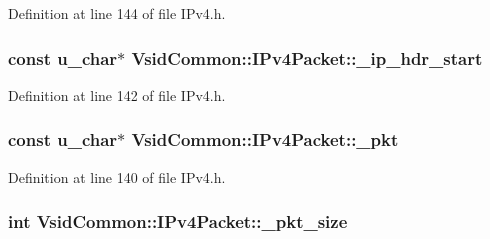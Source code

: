 Definition at line 144 of file I\-Pv4.\-h.

\hypertarget{class_vsid_common_1_1_i_pv4_packet_ab9d1ecb868ec5cd9f14e62b90edc05c8}{
\subsubsection[{\-\_\-ip\-\_\-hdr\-\_\-start}]{\setlength{\rightskip}{0pt plus 5cm}const u\-\_\-char$\ast$ Vsid\-Common\-::\-I\-Pv4\-Packet\-::\-\_\-ip\-\_\-hdr\-\_\-start\hspace{0.3cm}{\ttfamily [protected]}}}\label{class_vsid_common_1_1_i_pv4_packet_ab9d1ecb868ec5cd9f14e62b90edc05c8}


Definition at line 142 of file I\-Pv4.\-h.

\hypertarget{class_vsid_common_1_1_i_pv4_packet_ae39b78b3e02fe344d6a0aaa10bad55b6}{
\subsubsection[{\-\_\-pkt}]{\setlength{\rightskip}{0pt plus 5cm}const u\-\_\-char$\ast$ Vsid\-Common\-::\-I\-Pv4\-Packet\-::\-\_\-pkt\hspace{0.3cm}{\ttfamily [protected]}}}\label{class_vsid_common_1_1_i_pv4_packet_ae39b78b3e02fe344d6a0aaa10bad55b6}


Definition at line 140 of file I\-Pv4.\-h.

\hypertarget{class_vsid_common_1_1_i_pv4_packet_a2d4133be37c304ebf4951f975647a2f2}{
\subsubsection[{\-\_\-pkt\-\_\-size}]{\setlength{\rightskip}{0pt plus 5cm}int Vsid\-Common\-::\-I\-Pv4\-Packet\-::\-\_\-pkt\-\_\-size\hspace{0.3cm}{\ttfamily [protected]}}}\label{class_vsid_common_1_1_i_pv4_packet_a2d4133be37c304ebf4951f975647a2f2}


